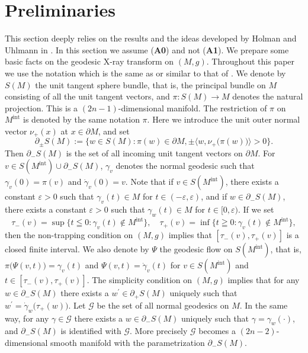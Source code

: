 \documentclass[a4paper,11pt,reqno]{amsart}
\numberwithin{equation}{section}
\theoremstyle{definition}
\theoremstyle{remark}
\begin{document}
\section{Preliminaries}
\label{section:preliminaries} 
This section deeply relies on the results and the ideas developed by Holman and Uhlmann in \cite{HolmanUhlmann}. 
In this section we assume ({\bf A0}) and not ({\bf A1}). We prepare some basic facts on the geodesic X-ray transform on $(M,g)$. Throughout this paper we use the notation which is the same as or similar to that of \cite{HolmanUhlmann}. We denote by $S(M)$ the unit tangent sphere bundle, that is, the principal bundle on $M$ consisting of all the unit tangent vectors, and $\pi:S(M){\rightarrow}M$ denotes the natural projection. This is a $(2n-1)$-dimensional manifold. The restriction of $\pi$ on $M^\text{int}$ is denoted by the same notation $\pi$. 
Here we introduce the unit outer normal vector $\nu_+(x)$ at $x \in \partial{M}$, and set 
%
%
$$
\partial_{\pm}S(M)
:=
\bigl\{w \in S(M) : \pi(w)\in\partial{M}, \pm\bigl\langle{w},\nu_+\bigl(\pi(w)\bigr)\bigr\rangle>0\}.
$$
%
%
Then $\partial_-S(M)$ is the set of all incoming unit tangent vectors on $\partial{M}$.  
For $v \in S(M^\text{int}){\cup}\partial_-S(M)$, $\gamma_v$ denotes the normal geodesic such that $\gamma_v(0)=\pi(v)$ and $\dot{\gamma}_v(0)=v$. 
Note that if $v \in S(M^\text{int})$, there exists a constant $\varepsilon>0$ such that 
$\gamma_v(t) \in M$ for $t\in(-\varepsilon,\varepsilon)$, and if $w \in \partial_-S(M)$, there exists a constant $\varepsilon>0$ such that $\gamma_w(t) \in M$ for $t\in[0,\varepsilon)$. 
If we set 
%
%
$$
\tau_-(v)
=
\sup\{t\leqq0 : \gamma_v(t) \not\in M^\text{int}\}, 
\quad
\tau_+(v)
=
\inf\{t\geqq0 : \gamma_v(t) \not\in M^\text{int}\}, 
$$
%
%
then the non-trapping condition on $(M,g)$ implies that $[\tau_-(v),\tau_+(v)]$ is a closed finite interval. 
We also denote by $\Psi$ the geodesic flow on $S(M^\text{int})$, that is, 
$\pi\bigl(\Psi(v,t)\bigr)=\gamma_v(t)$ and $\Psi(v,t)=\dot{\gamma}_v(t)$ 
for $v \in S(M^\text{int})$ and $t\in[\tau_-(v),\tau_+(v)]$. 
%
%
The simplicity condition on $(M,g)$ implies that for any $w\in\partial_-S(M)$ there exists a $w^\prime\in\partial_+S(M)$ uniquely such that $w^\prime=\dot{\gamma}_w\bigl(\tau_+(w)\bigr)$. 
Let $\mathcal{G}$ be the set of all normal geodesics on $M$. 
In the same way, for any $\gamma \in \mathcal{G}$ there exists a $w \in \partial_-S(M)$ uniquely such that $\gamma=\gamma_w(\cdot)$, and $\partial_-S(M)$ is identified with $\mathcal{G}$. More precisely $\mathcal{G}$ becomes a $(2n-2)$-dimensional smooth manifold with the parametrization $\partial_-S(M)$. 
\end{document}
